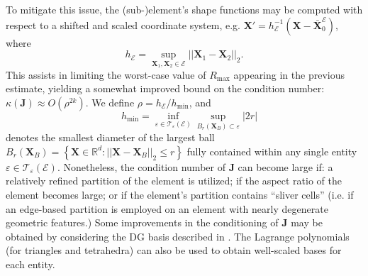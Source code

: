 To mitigate this issue, the (sub-)element's shape functions may be computed with respect to a shifted and scaled coordinate system, e.g. $\bm{X}' = h_\mathcal{E}^{-1} (\bm{X} - \bar{\bm{X}}^{\mathcal{E}}_0)$, where
\begin{equation}
	h_{\mathcal{E}} = \sup_{\bm{X}_1, \bm{X}_2 \in \mathcal{E}} ||\bm{X}_1 - \bm{X}_2||_2.
\end{equation}
This assists in limiting the worst-case value of $R_{\max}$ appearing in the previous estimate, yielding a somewhat improved bound on the condition number: $\kappa (\bm{J}) \approx O(\rho^{2k})$. We define $\rho = h_{\mathcal{E}} / h_{\min}$, and
\begin{equation}
	\quad h_{\min} = \inf_{\varepsilon \in \mathcal{T}_\varepsilon (\mathcal{E})} \sup_{B_r (\bm{X}_B) \subset \varepsilon} |2r|
\end{equation}
denotes the smallest diameter of the largest ball $B_r (\bm{X}_B) = \left\{ \bm{X} \in \mathbb{R}^d : ||\bm{X} - \bm{X}_B||_2 \leq r \right\}$ fully contained within any single entity $\varepsilon \in \mathcal{T}_\varepsilon (\mathcal{E})$. Nonetheless, the condition number of $\bm{J}$ can become large if: a relatively refined partition of the element is utilized; if the aspect ratio of the element becomes large; or if the element's partition contains ``sliver cells'' (i.e. if an edge-based partition is employed on an element with nearly degenerate geometric features.) Some improvements in the conditioning of $\bm{J}$ may be obtained by considering the DG basis described in \cite{Bassi:12}. The Lagrange polynomials (for triangles and tetrahedra) can also be used to obtain well-scaled bases for each entity.


